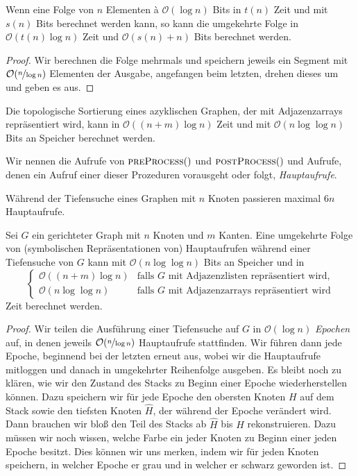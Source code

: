 \documentclass{cheat-sheet}
\renewcommand{\O}{\mathcal{O}} %
\begin{document}
\begin{lem}
  Wenn eine Folge von $n$ Elementen à $\O(\log n)$ Bits in $t(n)$ Zeit und mit $s(n)$ Bits berechnet werden kann, so kann die umgekehrte Folge in $\O(t(n) \log n)$ Zeit und $\O(s(n) + n)$ Bits berechnet werden.
\end{lem}

\begin{proof}
  Wir berechnen die Folge mehrmals und speichern jeweils ein Segment mit $\O(\nicefrac{n}{\log n})$ Elementen der Ausgabe, angefangen beim letzten, drehen dieses um und geben es aus.
\end{proof}

\begin{kor}
  Die topologische Sortierung eines azyklischen Graphen, der mit Adjazenzarrays repräsentiert wird, kann in $\O((n + m) \log n)$ Zeit und mit $\O(n \log \log n)$ Bits an Speicher berechnet werden.
\end{kor}

\begin{bezeichnung}
  Wir nennen die Aufrufe von $\Call{preProcess}$ und $\Call{postProcess}$ und Aufrufe, denen ein Aufruf einer dieser Prozeduren vorausgeht oder folgt, \textit{Hauptaufrufe}.
\end{bezeichnung}

\begin{bem}
  Während der Tiefensuche eines Graphen mit $n$ Knoten passieren maximal $6 n$ Hauptaufrufe.
\end{bem}

\begin{lem}
  Sei $G$ ein gerichteter Graph mit $n$ Knoten und $m$ Kanten.
  Eine umgekehrte Folge von (symbolischen Repräsentationen von) Hauptaufrufen während einer Tiefensuche von $G$ kann mit $\O(n \log \log n)$ Bits an Speicher und in
  \[
    \begin{cases}
      \O((n+m) \log n) & \text{falls $G$ mit Adjazenzlisten repräsentiert wird,} \\
      \O(n \log \log n) & \text{falls $G$ mit Adjazenzarrays repräsentiert wird}
    \end{cases}
  \]
  Zeit berechnet werden.
\end{lem}

\begin{proof}
  Wir teilen die Ausführung einer Tiefensuche auf $G$ in $\O(\log n)$ \textit{Epochen} auf, in denen jeweils $\O(\nicefrac{n}{\log n})$ Hauptaufrufe stattfinden.
  Wir führen dann jede Epoche, beginnend bei der letzten erneut aus, wobei wir die Hauptaufrufe mitloggen und danach in umgekehrter Reihenfolge ausgeben.
  Es bleibt noch zu klären, wie wir den Zustand des Stacks zu Beginn einer Epoche wiederherstellen können.
  Dazu speichern wir für jede Epoche den obersten Knoten $H$ auf dem Stack sowie den tiefsten Knoten $\hat{H}$, der während der Epoche verändert wird.
  Dann brauchen wir bloß den Teil des Stacks ab $\hat{H}$ bis $H$ rekonstruieren.
  Dazu müssen wir noch wissen, welche Farbe ein jeder Knoten zu Beginn einer jeden Epoche besitzt.
  Dies können wir uns merken, indem wir für jeden Knoten speichern, in welcher Epoche er grau und in welcher er schwarz geworden ist.
\end{proof}
\end{document}
